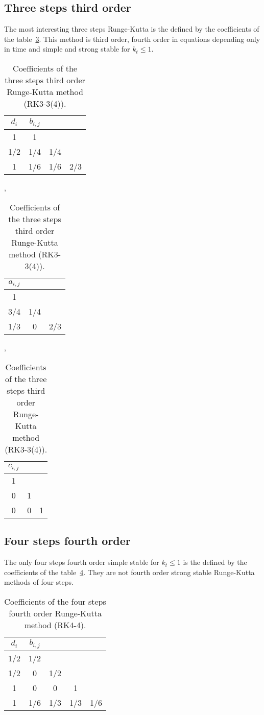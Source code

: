 \documentclass[a4paper]{article}
\begin{document}
\subsection{Three steps third order}

The most interesting three steps Runge-Kutta is the defined by the coefficients
of the table~\ref{TableRKiiiIII}.
This method is third order, fourth order in equations depending only in time and
simple and strong stable for $k_t\leq1$.
\begin{table}[ht]
	\centering
	\begin{tabular}{c|ccc}
		$d_{i}$ & $b_{i,j}$ \\ \hline
		1 & 1 \\
		1/2 & 1/4 & 1/4 \\
		1 & 1/6 & 1/6 & 2/3
	\end{tabular},~
	\begin{tabular}{ccc}
		$a_{i,j}$ \\ \hline
		1 \\
		3/4 & 1/4 \\
		1/3 & 0 & 2/3
	\end{tabular},~
	\begin{tabular}{ccc}
		$c_{i,j}$ \\ \hline
		1 \\
		0 & 1 \\
		0 & 0 & 1
	\end{tabular}
	\caption{Coefficients of the three steps third order Runge-Kutta method
		(RK3-3(4)).\label{TableRKiiiIII}}
\end{table}

\subsection{Four steps fourth order}

The only four steps fourth order simple stable for $k_t\leq1$ is the defined by
the coefficients of the table~\ref{TableRKivIV}.
They are not fourth order strong stable Runge-Kutta methods of four steps.
\begin{table}[ht]
	\centering
	\begin{tabular}{c|cccc}
		$d_{i}$ & $b_{i,j}$ \\ \hline
		1/2 & 1/2 \\
		1/2 & 0 & 1/2 \\
		1 & 0 & 0 & 1 \\
		1 & 1/6 & 1/3 & 1/3 & 1/6
	\end{tabular}
	\caption{Coefficients of the four steps fourth order Runge-Kutta method
		(RK4-4).\label{TableRKivIV}}
\end{table}
\end{document}
